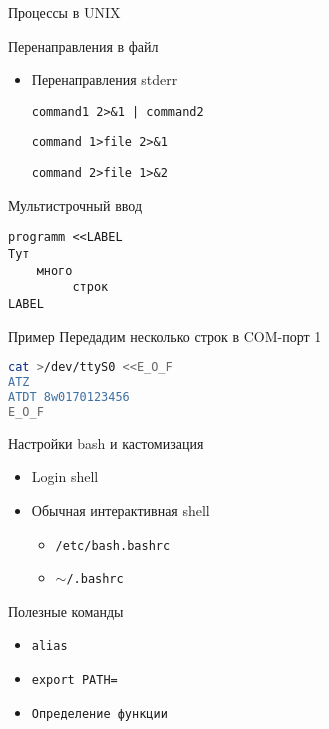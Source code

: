 \documentclass[ignorenonframetext, professionalfonts, hyperref={pdftex, unicode}]{beamer}
\begin{document}
\begin{frame}{Процессы в UNIX}
\begin{frame}{Перенаправления в файл}
\begin{itemize}
{\tt command < file}
\pause
\item Перенаправления stderr

{\tt command1 2>\&1 | command2}

{\tt command 1>file 2>\&1}

{\tt command 2>file 1>\&2}
\end{itemize}
\end{frame}

\begin{frame}[fragile]{Мультистрочный ввод}

\begin{verbatim}
programm <<LABEL
Тут
    много
	     строк
LABEL
\end{verbatim}

	\pause
	\begin{block}{Пример}
	Передадим несколько строк в COM-порт 1
\begin{lstlisting}[language=bash]
cat >/dev/ttyS0 <<E_O_F
ATZ
ATDT 8w0170123456
E_O_F
\end{lstlisting}
	\end{block}
\end{frame}




\begin{frame}{Настройки bash и кастомизация}
\begin{itemize}
  \item Login shell
   \begin{itemize}
      \item {\tt /etc/profile}
      \item {\tt $\sim$/.profile
   \end{itemize}
  \item Обычная интерактивная shell
  \begin{itemize}
  \item {\tt /etc/bash.bashrc}
  \item {\tt $\sim$/.bashrc}
  \end{itemize}
\end{itemize}

Полезные команды
\begin{itemize}
\item {\tt alias}
\item {\tt export PATH=}
\item {\tt Определение функции}
\end{itemize}

\end{frame}


\end{frame}
\end{document}
